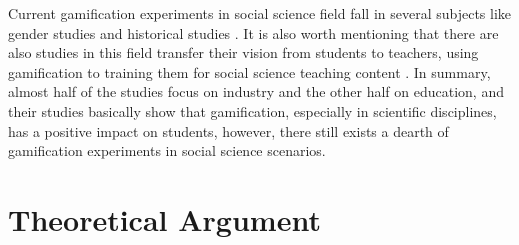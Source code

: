 \documentclass[12pt]{article} %
\begin{document}
\par
\noindent Current gamification experiments in social science field fall in several subjects like gender studies \citep{ortega2019gamification} and historical studies \citep{cozar2016game}. It is also worth mentioning that there are also studies in this field transfer their vision from students to teachers, using gamification to training them for social science teaching content \citep{yildiz2021effect}.  In summary, almost half of the studies focus on industry and the other half on education, and their studies basically show that gamification, especially in scientific disciplines, has a positive impact on students, however, there still exists a dearth of gamification experiments in social science scenarios.

\newpage

\section*{Theoretical Argument}

\vspace{.5cm}
\end{document}
